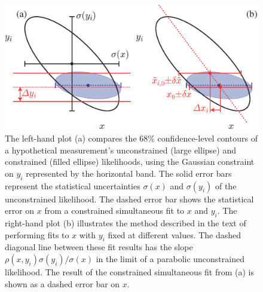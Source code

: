 \begin{figure}
\begin{center}
\includegraphics[width=6.0in]{figures/meth/figure1.eps}
\end{center}
\caption{The left-hand plot (a) compares the 68\% confidence-level
  contours of a
  hypothetical measurement's unconstrained (large ellipse) and
  constrained (filled ellipse) likelihoods, using the Gaussian
  constraint on $y_i$ represented by the horizontal band. The solid
  error bars represent the statistical uncertainties $\sigma(x)$ and
  $\sigma(y_i)$ of the unconstrained likelihood. The dashed
  error bar shows the statistical error on $x$ from a
  constrained simultaneous fit to $x$ and $y_i$. The right-hand plot
  (b) illustrates the method described in the text of performing fits
  to $x$ with $y_i$ fixed at different values. The dashed
  diagonal line between these fit results has the slope
  $\rho(x,y_i)\sigma(y_i)/\sigma(x)$ in the limit of a parabolic
  unconstrained likelihood. The result of the constrained simultaneous
  fit from (a) is shown as a dashed error bar on $x$.}
\label{fig:singlefit}
\end{figure}

